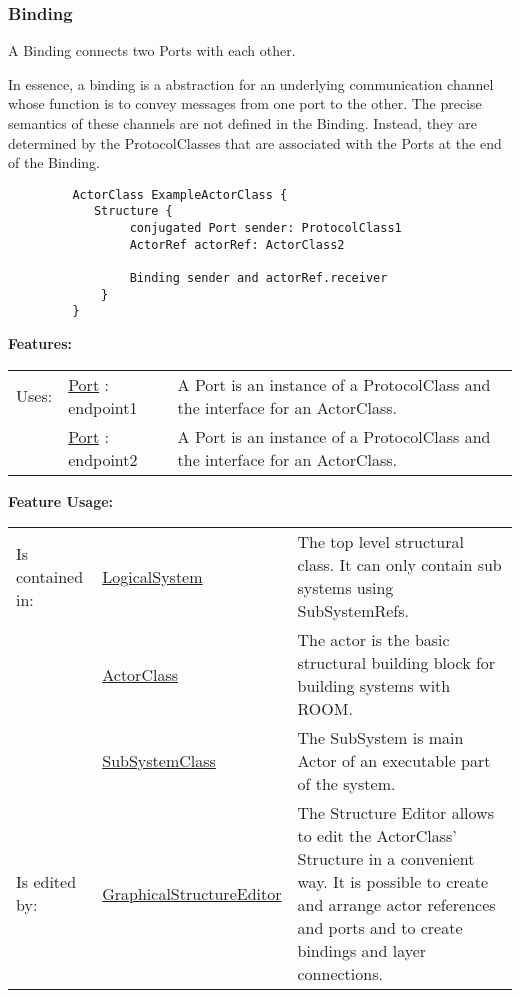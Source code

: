 	\vspace{\baselineskip}
	\vspace{\baselineskip}
	\vspace{\baselineskip}
	
\subsubsection{Binding}
	\hypertarget{ref:Binding}{}
	A Binding connects two Ports with each other.
		
		In essence, a binding is a abstraction for an underlying communication channel whose function is to convey messages from one port to the other.
		The precise semantics of these channels are not defined in the Binding. Instead, they are determined by the ProtocolClasses that are associated with the Ports at the end of the Binding.
	
		\begin{lstlisting}
		 ActorClass ExampleActorClass {
			Structure {
				 conjugated Port sender: ProtocolClass1
				 ActorRef actorRef: ActorClass2
				 
				 Binding sender and actorRef.receiver
			 }
		 }
		 \end{lstlisting}
		
		
	\begingroup
	\textbf{Features:}
	\renewcommand{\arraystretch}{1.8} %
	\begin{longtable}{l|l p{}}
		\hline
	Uses: & \tabitem \hyperlink{ref:Port}{Port} : endpoint1 & A Port is an instance of a ProtocolClass and the interface for an ActorClass.\\
	& \tabitem \hyperlink{ref:Port}{Port} : endpoint2 & A Port is an instance of a ProtocolClass and the interface for an ActorClass. \\
	\hline
	\end{longtable}
	\endgroup
		
	\begingroup
	\textbf{Feature Usage:}
	\renewcommand{\arraystretch}{1.8} %
	\begin{longtable}{l|l p{}}
		\hline
	Is contained in: & \tabitem \hyperlink{ref:LogicalSystem}{LogicalSystem}  & The top level structural class. It can only contain sub systems using SubSystemRefs.\\
	& \tabitem \hyperlink{ref:ActorClass}{ActorClass}  & The actor is the basic structural building block for building systems with ROOM. \\
	& \tabitem \hyperlink{ref:SubSystemClass}{SubSystemClass}  & The SubSystem is main Actor of an executable part of the system.  \\
	\hline
	Is edited by: & \tabitem \hyperlink{ref:GraphicalStructureEditor}{GraphicalStructureEditor}  & The Structure Editor allows to edit the ActorClass' Structure in a convenient way. It is possible to create and arrange actor references and ports and to create bindings and layer connections.\\
	\hline
	\end{longtable}
	\endgroup
		

